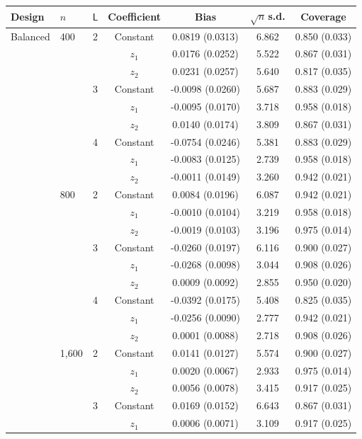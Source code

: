 \begin{tabular}{llccccc}
\toprule
Design & $n$ & $\mathsf L$ & Coefficient & Bias & $\sqrt{n}\,$s.d. & Coverage \\
\midrule
Balanced & 400 & 2 & Constant & 0.0819 (0.0313) & 6.862 & 0.850 (0.033) \\
 &  &  & $z_1$ & 0.0176 (0.0252) & 5.522 & 0.867 (0.031) \\
 &  &  & $z_2$ & 0.0231 (0.0257) & 5.640 & 0.817 (0.035) \\
\addlinespace
 &  & 3 & Constant & -0.0098 (0.0260) & 5.687 & 0.883 (0.029) \\
 &  &  & $z_1$ & -0.0095 (0.0170) & 3.718 & 0.958 (0.018) \\
 &  &  & $z_2$ & 0.0140 (0.0174) & 3.809 & 0.867 (0.031) \\
\addlinespace
 &  & 4 & Constant & -0.0754 (0.0246) & 5.381 & 0.883 (0.029) \\
 &  &  & $z_1$ & -0.0083 (0.0125) & 2.739 & 0.958 (0.018) \\
 &  &  & $z_2$ & -0.0011 (0.0149) & 3.260 & 0.942 (0.021) \\
\addlinespace
 & 800 & 2 & Constant & 0.0084 (0.0196) & 6.087 & 0.942 (0.021) \\
 &  &  & $z_1$ & -0.0010 (0.0104) & 3.219 & 0.958 (0.018) \\
 &  &  & $z_2$ & -0.0019 (0.0103) & 3.196 & 0.975 (0.014) \\
\addlinespace
 &  & 3 & Constant & -0.0260 (0.0197) & 6.116 & 0.900 (0.027) \\
 &  &  & $z_1$ & -0.0268 (0.0098) & 3.044 & 0.908 (0.026) \\
 &  &  & $z_2$ & 0.0009 (0.0092) & 2.855 & 0.950 (0.020) \\
\addlinespace
 &  & 4 & Constant & -0.0392 (0.0175) & 5.408 & 0.825 (0.035) \\
 &  &  & $z_1$ & -0.0256 (0.0090) & 2.777 & 0.942 (0.021) \\
 &  &  & $z_2$ & 0.0001 (0.0088) & 2.718 & 0.908 (0.026) \\
\addlinespace
 & 1,600 & 2 & Constant & 0.0141 (0.0127) & 5.574 & 0.900 (0.027) \\
 &  &  & $z_1$ & 0.0020 (0.0067) & 2.933 & 0.975 (0.014) \\
 &  &  & $z_2$ & 0.0056 (0.0078) & 3.415 & 0.917 (0.025) \\
\addlinespace
 &  & 3 & Constant & 0.0169 (0.0152) & 6.643 & 0.867 (0.031) \\
 &  &  & $z_1$ & 0.0006 (0.0071) & 3.109 & 0.917 (0.025) \\

\end{tabular}
